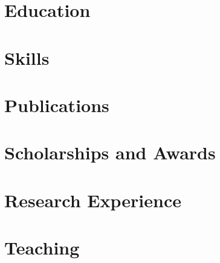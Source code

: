 \documentclass[14pt]{prometheus_cv}
\begin{document}
\thispagestyle{empty}					%
\pagestyle{fancy}			 		%

\vspace*{-1cm}
\centering 


\vspace*{0.4cm}
\section{Education}


\section{Skills}


\section{Publications}


\section{Scholarships and Awards}


\section{Research Experience}


\section{Teaching}

\end{document}
